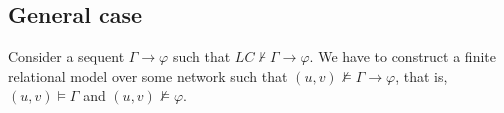 \documentclass[a4paper]{article}
\theoremstyle{defin}
\theoremstyle{theorem}
\theoremstyle{claim}
\theoremstyle{prop}
\theoremstyle{lemma}
\theoremstyle{fact}
\theoremstyle{ex}
\theoremstyle{col}
\begin{document}
\subsection{General case}

Consider a sequent $\Gamma \rightarrow \varphi$ such that $LC \not\vdash \Gamma \rightarrow \varphi$. We have to construct a finite relational model over some network such that $(u, v) \not\models \Gamma \rightarrow \varphi$, that is, $(u, v) \models \Gamma$ and $(u, v) \not\models \varphi$.



\end{document}
